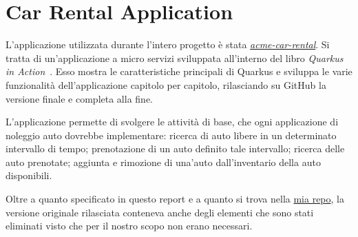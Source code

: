 \chapter{Car Rental Application}
L'applicazione utilizzata durante l'intero progetto è stata \href{https://github.com/xstefank/quarkus-in-action}{\textit{acme-car-rental}}. Si tratta di un'applicazione a micro servizi sviluppata all'interno del libro \textit{Quarkus in Action}~\cite{quarkusinaction}. Esso mostra le caratteristiche principali di Quarkus e sviluppa le varie funzionalità dell'applicazione capitolo per capitolo, rilasciando su GitHub la versione finale e completa alla fine.

L'applicazione permette di svolgere le attività di base, che ogni applicazione di noleggio auto dovrebbe implementare: ricerca di auto libere in un determinato intervallo di tempo; prenotazione di un auto definito tale intervallo; ricerca delle auto prenotate; aggiunta e rimozione di una'auto dall'inventario della auto disponibili.

\myskip

Oltre a quanto specificato in questo report e a quanto si trova nella \href{https://github.com/edoardosarri24/quarkus-car-rental}{mia repo}, la versione originale rilasciata conteneva anche degli elementi che sono stati eliminati visto che per il nostro scopo non erano necessari.

